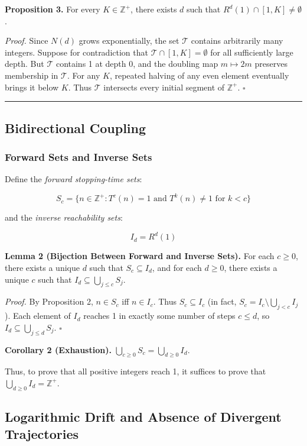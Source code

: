 \documentclass[12pt,a4paper]{article}
\begin{document}
\textbf{Proposition 3.} For every $K \in \mathbb{Z}^+$, there exists $d$ such that $R^d(1) \cap [1, K] \neq \emptyset$.

\emph{Proof.} Since $N(d)$ grows exponentially, the set $\mathcal{T}$ contains arbitrarily many integers. Suppose for contradiction that $\mathcal{T} \cap [1, K] = \emptyset$ for all sufficiently large depth. But $\mathcal{T}$ contains 1 at depth 0, and the doubling map $m \mapsto 2m$ preserves membership in $\mathcal{T}$. For any $K$, repeated halving of any even element eventually brings it below $K$. Thus $\mathcal{T}$ intersects every initial segment of $\mathbb{Z}^+$. $\square$

\begin{center}
\rule{0.5\textwidth}{0.4pt}
\end{center}

\subsection{Bidirectional Coupling}

\subsubsection{Forward Sets and Inverse Sets}

Define the \emph{forward stopping-time sets}:

\[S_c = \{n \in \mathbb{Z}^+ : T^c(n) = 1 \text{ and } T^k(n) \neq 1 \text{ for } k < c\}\]

and the \emph{inverse reachability sets}:

\[I_d = R^d(1)\]

\textbf{Lemma 2 (Bijection Between Forward and Inverse Sets).} For each $c \geq 0$, there exists a unique $d$ such that $S_c \subseteq I_d$, and for each $d \geq 0$, there exists a unique $c$ such that $I_d \subseteq \bigcup_{j \leq c} S_j$.

\emph{Proof.} By Proposition 2, $n \in S_c$ iff $n \in I_c$. Thus $S_c \subseteq I_c$ (in fact, $S_c = I_c \setminus \bigcup_{j < c} I_j$). Each element of $I_d$ reaches 1 in exactly some number of steps $c \leq d$, so $I_d \subseteq \bigcup_{j \leq d} S_j$. $\square$

\textbf{Corollary 2 (Exhaustion).} $\bigcup_{c \geq 0} S_c = \bigcup_{d \geq 0} I_d$.

Thus, to prove that all positive integers reach 1, it suffices to prove that $\bigcup_{d \geq 0} I_d = \mathbb{Z}^+$.

\subsection{Logarithmic Drift and Absence of Divergent Trajectories}
\end{document}
